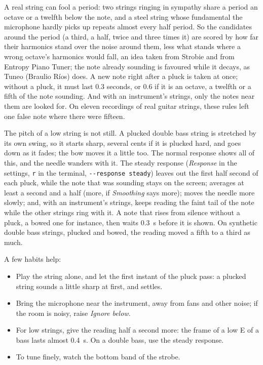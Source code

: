 \documentclass[12pt,
              article,
              oneside
              ]{memoir}
\newcommand*{\menu}[1]{\textit{#1}}
\newcommand*{\key}[1]{\texttt{#1}}
\begin{document}
%
A real string can fool a period: two strings ringing in sympathy share a
period an octave or a twelfth below the note, and a steel string whose
fundamental the microphone hardly picks up repeats almost every half
period. So the candidates around the period (a third, a half, twice and
three times it) are scored by how far their harmonics stand over the noise
around them, less what stands where a wrong octave's harmonics would fall,
an idea taken from Strobie and from Entropy Piano Tuner; the note already
sounding is favoured while it decays, as Tuneo (Braulio Ríos) does. A new
note right after a pluck is taken at once; without a pluck, it must last
0.3 seconds, or 0.6 if it is an octave, a twelfth or a fifth of the note
sounding. And with an instrument's strings, only the notes near them are
looked for. On eleven recordings of real guitar strings, these rules left
one false note where there were fifteen.

%
The pitch of a low string is not still. A plucked double bass string is
stretched by its own swing, so it starts sharp, several cents if it is
plucked hard, and goes down as it fades; the bow moves it a little too.
The normal response shows all of this, and the needle wanders with it.
The steady response (\menu{Response} in the settings, \key{r} in the
terminal, \texttt{-{}-response steady}) leaves out the first half second
of each pluck, while the note that was sounding stays on the screen;
averages at least a second and a half (more, if \menu{Smoothing} says
more); moves the needle more slowly; and, with an instrument's strings,
keeps reading the faint tail of the note while the other strings ring
with it. A note that rises from silence without a pluck, a bowed one for
instance, then waits 0.3~s before it is shown. On synthetic double bass
strings, plucked and bowed, the reading moved a fifth to a third as much.

%
A few habits help:

\begin{itemize}
\item Play the string alone, and let the first instant of the pluck pass:
  a plucked string sounds a little sharp at first, and settles.
\item Bring the microphone near the instrument, away from fans and other
  noise; if the room is noisy, raise \menu{Ignore below}.
\item For low strings, give the reading half a second more: the frame of a
  low E of a bass lasts almost 0.4~s. On a double bass, use the steady
  response.
\item To tune finely, watch the bottom band of the strobe.
\end{itemize}
\end{document}
